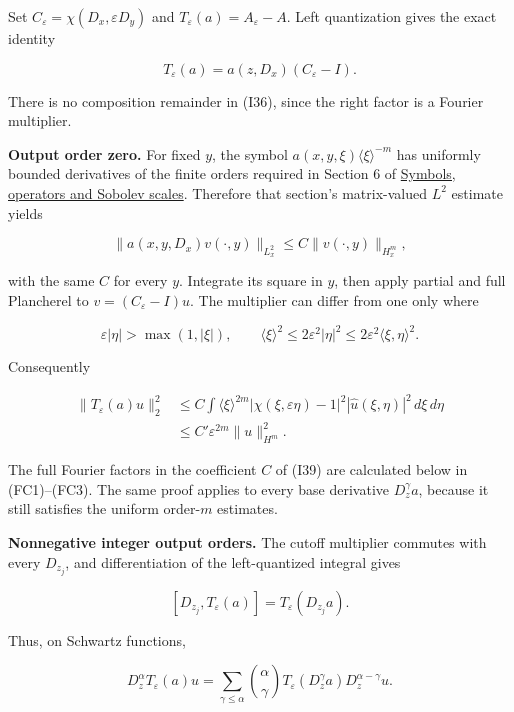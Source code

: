 \documentclass[
  11pt,
]{article}
\begin{document}
Set \(C_\varepsilon=\chi(D_x,\varepsilon D_y)\) and
\(T_\varepsilon(a)=A_\varepsilon-A\). Left quantization gives the exact
identity

\[
 T_\varepsilon(a)=a(z,D_x)(C_\varepsilon-I).
 \tag{I36}
\]

There is no composition remainder in (I36), since the right factor is a
Fourier multiplier.

\textbf{Output order zero.} For fixed \(y\), the symbol
\(a(x,y,\xi)\langle\xi\rangle^{-m}\) has uniformly bounded derivatives
of the finite orders required in Section 6 of
\href{euclidean-symbol-calculus.pdf}{Symbols, operators and Sobolev
scales}. Therefore that section's matrix-valued \(L^2\) estimate yields

\[
 \|a(x,y,D_x)v(\cdot,y)\|_{L^2_x}
      \leq C\|v(\cdot,y)\|_{H^m_x},
 \tag{I37}
\]

with the same \(C\) for every \(y\). Integrate its square in \(y\), then
apply partial and full Plancherel to \(v=(C_\varepsilon-I)u\). The
multiplier can differ from one only where

\[
 \varepsilon|\eta|>\max(1,|\xi|),\qquad
 \langle\xi\rangle^2\leq2\varepsilon^2|\eta|^2
                    \leq2\varepsilon^2\langle\xi,\eta\rangle^2.
 \tag{I38}
\]

Consequently

\[
 \begin{aligned}
 \|T_\varepsilon(a)u\|_2^2
 &\leq C\int\langle\xi\rangle^{2m}
       |\chi(\xi,\varepsilon\eta)-1|^2
       |\widehat u(\xi,\eta)|^2\,d\xi\,d\eta\\
 &\leq C'\varepsilon^{2m}\|u\|_{H^m}^2.
 \end{aligned}
 \tag{I39}
\]

The full Fourier factors in the coefficient \(C\) of (I39) are
calculated below in (FC1)--(FC3). The same proof applies to every base
derivative \(D_z^\gamma a\), because it still satisfies the uniform
order-\(m\) estimates.

\textbf{Nonnegative integer output orders.} The cutoff multiplier
commutes with every \(D_{z_j}\), and differentiation of the
left-quantized integral gives

\[
 [D_{z_j},T_\varepsilon(a)]=T_\varepsilon(D_{z_j}a).
 \tag{I40}
\]

Thus, on Schwartz functions,

\[
 D_z^\alpha T_\varepsilon(a)u
   =\sum_{\gamma\leq\alpha}{\alpha\choose\gamma}
       T_\varepsilon(D_z^\gamma a)D_z^{\alpha-\gamma}u.
 \tag{I41}
\]
\end{document}
